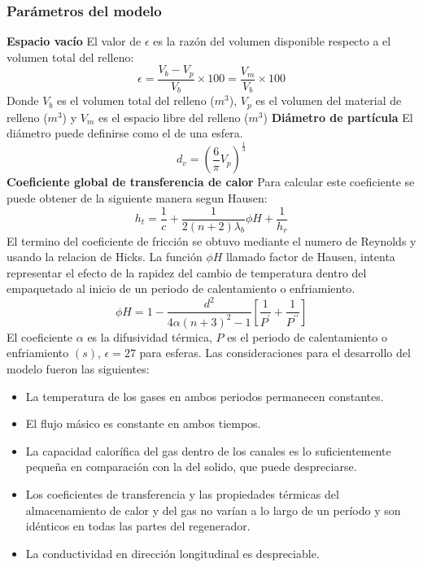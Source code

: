 \documentclass[12pt,letterpaper,final]{article}%
\begin{document}
\subsubsection*{Parámetros del modelo}
\textbf{Espacio vacío}
\newline
El valor de $\epsilon$ es la razón del volumen disponible respecto a el volumen total del relleno:
\begin{equation}
	\epsilon = \frac{V_b -V_p}{V_b} \times 100 = \frac{V_m}{V_b} \times 100
\end{equation}
Donde $V_b$ es el volumen total del relleno ($m^3$), $V_p$ es el volumen del material de relleno ($m^3$) y $V_m$ es el espacio libre del relleno ($m^3$)
\newline
\textbf{Diámetro de partícula}
\newline
El diámetro puede definirse como el de una esfera.
\begin{equation}
	d_v=(\frac{6}{\pi}V_p)^{\frac{1}{3}}
\end{equation}
\textbf{Coeficiente global de transferencia de calor}
\newline
Para calcular este coeficiente se puede obtener de la siguiente manera segun Hausen\cite{Hausen1976}:
\begin{equation}
	h_t= \frac{1}{c} + \frac{1}{2(n+2)\lambda_b}\phi H + \frac{1}{h_r}
\end{equation}
El termino del coeficiente de fricción se obtuvo mediante el numero de Reynolds y usando la relacion de Hicks\cite{Hicks1970}.
\newline
La función $\phi H$ llamado factor de Hausen, intenta representar el efecto de la rapidez del cambio de temperatura dentro del empaquetado al inicio de un periodo de calentamiento o enfriamiento\cite{HINCHCLIFFE1981}.
\begin{equation}
	\phi H = 1 - \frac{d^2}{4 \alpha (n + 3)^2 - 1}  [\frac{1}{P^\prime} + \frac{1}{P^{\prime\prime}}]
\end{equation}
El coeficiente $\alpha$ es la difusividad térmica, $P$ es el periodo de calentamiento o enfriamiento $(s)$, $\epsilon =27$ para esferas.
\newline
Las consideraciones para el desarrollo del modelo fueron las siguientes:
\begin{itemize}
	\item La temperatura de los gases en ambos periodos permanecen constantes.
	\item El flujo másico es constante en ambos tiempos.
	\item La capacidad calorífica del gas dentro de los canales es lo suficientemente pequeña en comparación con la del solido, que puede despreciarse.
	\item Los coeficientes de transferencia y las propiedades térmicas del almacenamiento de calor y del gas no varían a lo largo de un período y son idénticos en todas las partes del regenerador.
	\item La conductividad en dirección longitudinal es despreciable. 
\end{itemize}
\end{document}
